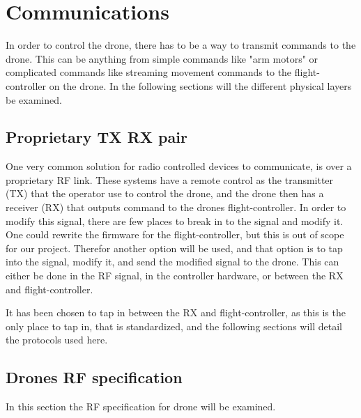 \section{Communications}\label{s:coms}
In order to control the drone, there has to be a way to transmit commands to the drone. This can be anything from simple commands like "arm motors" or complicated commands like streaming movement commands to the flight-controller on the drone.
In the following sections will the different physical layers be examined. 

\subsection*{Proprietary TX RX pair}\label{ss:rc-txrx}
One very common solution for radio controlled devices to communicate, is over a proprietary RF link. These systems have a remote control as the transmitter (TX) that the operator use to control the drone, and the drone then has a receiver (RX) that outputs command to the drones flight-controller.
\newline
In order to modify this signal, there are few places to break in to the signal and modify it. One could rewrite the firmware for the flight-controller, but this is out of scope for our project. Therefor another option will be used, and that option is to tap into the signal, modify it, and send the modified signal to the drone.
This can either be done in the RF signal, in the controller hardware, or between the RX and flight-controller. 

It has been chosen to tap in between the RX and flight-controller, as this is the only place to tap in, that is standardized, and the following sections will detail the protocols used here.\\
\newline

\subsection*{Drones RF specification}
In this section the RF specification for drone will be examined. 


